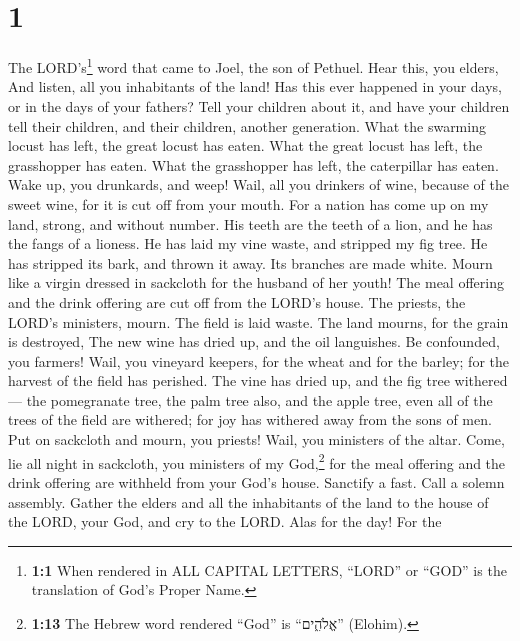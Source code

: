 \hypertarget{section}{%
\section{1}\label{section}}

 The LORD's\footnote{\textbf{1:1} When rendered in ALL
  CAPITAL LETTERS, ``LORD'' or ``GOD'' is the translation of God's
  Proper Name.} word that came to Joel, the son of Pethuel.
 Hear this, you elders, And listen, all you inhabitants of
the land! Has this ever happened in your days, or in the days of your
fathers?  Tell your children about it, and have your
children tell their children, and their children, another generation.
 What the swarming locust has left, the great locust has
eaten. What the great locust has left, the grasshopper has eaten. What
the grasshopper has left, the caterpillar has eaten.  Wake
up, you drunkards, and weep! Wail, all you drinkers of wine, because of
the sweet wine, for it is cut off from your mouth.  For a
nation has come up on my land, strong, and without number. His teeth are
the teeth of a lion, and he has the fangs of a lioness. 
He has laid my vine waste, and stripped my fig tree. He has stripped its
bark, and thrown it away. Its branches are made white. 
Mourn like a virgin dressed in sackcloth for the husband of her youth!
 The meal offering and the drink offering are cut off from
the LORD's house. The priests, the LORD's ministers, mourn.
 The field is laid waste. The land mourns, for the grain
is destroyed, The new wine has dried up, and the oil languishes.
 Be confounded, you farmers! Wail, you vineyard keepers,
for the wheat and for the barley; for the harvest of the field has
perished.  The vine has dried up, and the fig tree
withered--- the pomegranate tree, the palm tree also, and the apple
tree, even all of the trees of the field are withered; for joy has
withered away from the sons of men.  Put on sackcloth and
mourn, you priests! Wail, you ministers of the altar. Come, lie all
night in sackcloth, you ministers of my God,\footnote{\textbf{1:13} The
  Hebrew word rendered ``God'' is ``אֱלֹהִ֑ים'' (Elohim).} for the meal
offering and the drink offering are withheld from your God's house.
 Sanctify a fast. Call a solemn assembly. Gather the
elders and all the inhabitants of the land to the house of the LORD,
your God, and cry to the LORD.  Alas for the day! For the
